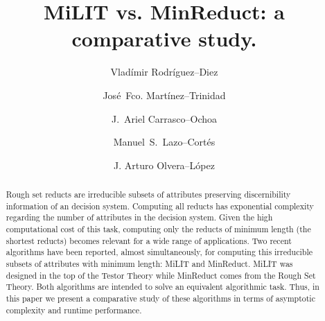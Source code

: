 \documentclass[citenumber]{llncs}
\begin{document}
\mainmatter              %
%
\title{MiLIT vs. MinReduct: a comparative study.}
			 
\author{Vlad\'{i}mir Rodr\'{i}guez--Diez \and Jos\'{e}~Fco. Mart\'{i}nez--Trinidad
		 \and J.~Ariel Carrasco--Ochoa \and Manuel~S.~Lazo--Cortés \and J. Arturo Olvera--López}
%
%


\maketitle              %

\begin{abstract}
	Rough set reducts are irreducible subsets of attributes preserving discernibility information of an decision system. Computing all reducts has exponential complexity regarding the number of attributes in the decision system. Given the high computational cost of this task, computing only the reducts of minimum length (the shortest reducts) becomes relevant for a wide range of applications. Two recent algorithms have been reported, almost simultaneously, for computing this irreducible subsets of attributes with minimum length: MiLIT and MinReduct. MiLIT was designed in the top of the Testor Theory while MinReduct comes from the Rough Set Theory. Both algorithms are intended to solve an equivalent algorithmic task. Thus, in this paper we present a comparative study of these algorithms in terms of asymptotic complexity and runtime performance. 
	
\end{abstract}
%
\end{document}
